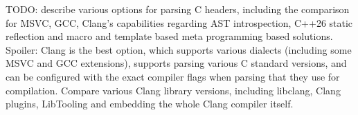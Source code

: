 TODO: describe various options for parsing C headers, including the comparison for MSVC, GCC, Clang's capabilities regarding AST introspection, C++26 static reflection and macro and template based meta programming based solutions. Spoiler: Clang is the best option, which supports various dialects (including some MSVC and GCC extensions), supports parsing various C standard versions, and can be configured with the exact compiler flags when parsing that they use for compilation. Compare various Clang library versions, including libclang, Clang plugins, LibTooling and embedding the whole Clang compiler itself.








\bigbreak \bigbreak \bigbreak
\bigbreak \bigbreak \bigbreak
\bigbreak \bigbreak \bigbreak
\bigbreak \bigbreak \bigbreak
\bigbreak \bigbreak \bigbreak
\bigbreak \bigbreak \bigbreak
\bigbreak \bigbreak \bigbreak
\bigbreak \bigbreak \bigbreak
\bigbreak \bigbreak \bigbreak
\bigbreak \bigbreak \bigbreak
\bigbreak \bigbreak \bigbreak
\bigbreak \bigbreak \bigbreak
\bigbreak \bigbreak \bigbreak
\bigbreak \bigbreak \bigbreak
\bigbreak \bigbreak \bigbreak
\bigbreak \bigbreak \bigbreak
\bigbreak \bigbreak \bigbreak
\bigbreak \bigbreak \bigbreak
\bigbreak \bigbreak \bigbreak
\bigbreak \bigbreak \bigbreak
\bigbreak \bigbreak \bigbreak
\bigbreak \bigbreak \bigbreak
\bigbreak \bigbreak \bigbreak
\bigbreak \bigbreak \bigbreak
\bigbreak \bigbreak \bigbreak
\bigbreak \bigbreak \bigbreak
\bigbreak \bigbreak \bigbreak
\bigbreak \bigbreak \bigbreak
\bigbreak \bigbreak \bigbreak





\bigbreak \bigbreak \bigbreak
\bigbreak \bigbreak \bigbreak
\bigbreak \bigbreak \bigbreak
\bigbreak \bigbreak \bigbreak
\bigbreak \bigbreak \bigbreak
\bigbreak \bigbreak \bigbreak
\bigbreak \bigbreak \bigbreak
\bigbreak \bigbreak \bigbreak
\bigbreak \bigbreak \bigbreak
\bigbreak \bigbreak \bigbreak
\bigbreak \bigbreak \bigbreak
\bigbreak \bigbreak \bigbreak
\bigbreak \bigbreak \bigbreak
\bigbreak \bigbreak \bigbreak
\bigbreak \bigbreak \bigbreak
\bigbreak \bigbreak \bigbreak
\bigbreak \bigbreak \bigbreak
\bigbreak \bigbreak \bigbreak
\bigbreak \bigbreak \bigbreak
\bigbreak \bigbreak \bigbreak
\bigbreak \bigbreak \bigbreak
\bigbreak \bigbreak \bigbreak
\bigbreak \bigbreak \bigbreak
\bigbreak \bigbreak \bigbreak
\bigbreak \bigbreak \bigbreak
\bigbreak \bigbreak \bigbreak
\bigbreak \bigbreak \bigbreak
\bigbreak \bigbreak \bigbreak
\bigbreak \bigbreak \bigbreak



